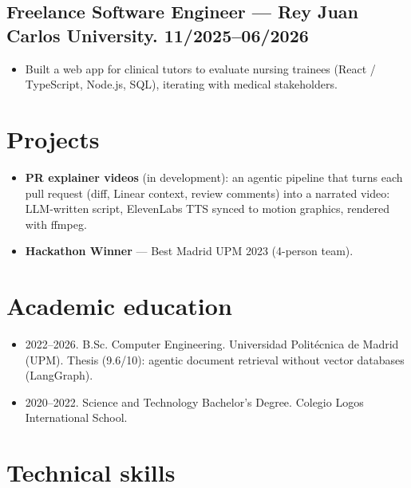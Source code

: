 \documentclass{article}
\begin{document}
\subsection*{\hspace{0.25cm} Freelance Software Engineer --- Rey Juan Carlos University. 11/2025--06/2026}
\begin{itemize}
    \item Built a web app for clinical tutors to evaluate nursing trainees (React / TypeScript, Node.js, SQL), iterating with medical stakeholders.
\end{itemize}

\section*{Projects}
\begin{itemize}
    \item \textbf{PR explainer videos} (in development): an agentic pipeline that turns each pull request (diff, Linear context, review comments) into a narrated video: LLM-written script, ElevenLabs TTS synced to motion graphics, rendered with ffmpeg.
    \item \textbf{Hackathon Winner} --- Best Madrid UPM 2023 (4-person team).
\end{itemize}

\section*{Academic education}

\begin{itemize}
    \item 2022--2026. B.Sc. Computer Engineering. Universidad Polit\'ecnica de Madrid (UPM). Thesis (9.6/10): agentic document retrieval without vector databases (LangGraph).
    \item 2020--2022. Science and Technology Bachelor's Degree. Colegio Logos International School.
\end{itemize}

\section*{Technical skills}
\end{document}
